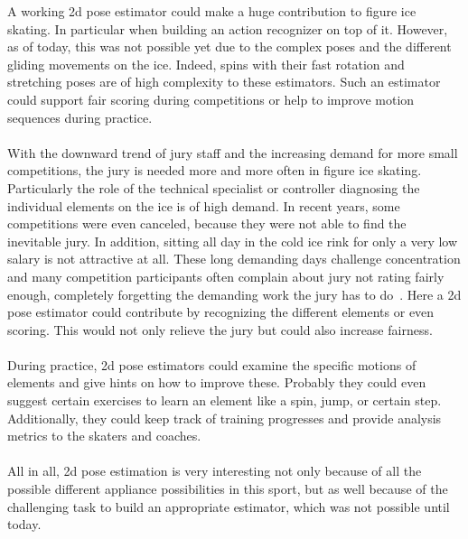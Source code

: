 A working 2d pose estimator could make a huge contribution to figure ice skating.
In particular when building an action recognizer on top of it.
However, as of today, this was not possible yet due to the complex poses and the different gliding movements
on the ice.
Indeed, spins with their fast rotation and stretching poses are of high complexity to these estimators.
Such an estimator could support fair scoring during competitions or help to improve motion sequences during
practice.
\\\mbox{}\\
With the downward trend of jury staff and the increasing demand for more small competitions, the jury is needed
more and more often in figure ice skating.
Particularly the role of the technical specialist or controller diagnosing the individual elements on the ice
is of high demand.
In recent years, some competitions were even canceled, because they were not able to find the inevitable jury.
In addition, sitting all day in the cold ice rink for only a very low salary is not attractive at all.
These long demanding days challenge concentration and many competition participants often complain about jury
not rating fairly enough,
completely forgetting the demanding work the jury has to do~\cite{ungerjuryinterview, juryunger3minutes, unfairjudge}.
Here a 2d pose estimator could contribute by recognizing the different elements or even scoring.
This would not only relieve the jury but could also increase fairness.
\\\mbox{}\\
    During practice, 2d pose estimators could examine the specific motions of elements and give hints on how to
    improve these.
    Probably they could even suggest certain exercises to learn an element like a spin, jump, or certain step.
    Additionally, they could keep track of training progresses and provide analysis metrics to the skaters and coaches.
    \\\mbox{}\\
    All in all, 2d pose estimation is very interesting not only because of all the possible different appliance
    possibilities in this sport,
    but as well because of the
    challenging task to build an appropriate estimator, which was not possible until today.



